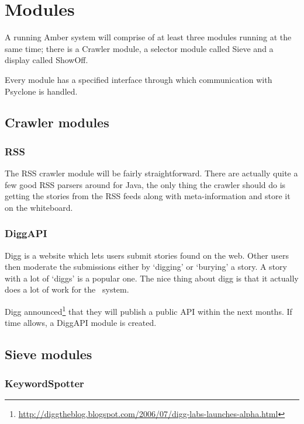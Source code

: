 \section{\label{sct:modules}Modules}

A running Amber system will comprise of at least three modules running at the
same time; there is a Crawler module, a selector module called Sieve and a
display called ShowOff.

Every module has a specified interface through which communication with
Psyclone is handled.

\subsection{Crawler modules}

\subsubsection{RSS}

The RSS crawler module will be fairly straightforward. There are actually quite
a few good RSS parsers around for Java, the only thing the crawler should do is
getting the stories from the RSS feeds along with meta-information and store it
on the whiteboard.

\subsubsection{DiggAPI}

Digg is a website which lets users submit stories found on the web. Other users
then moderate the submissions either by `digging' or `burying' a story. A story
with a lot of `diggs' is a popular one. The nice thing about digg is that it
actually does a lot of work for the \Amber\ system.

Digg
announced\footnote{\url{http://diggtheblog.blogspot.com/2006/07/digg-labs-launches-alpha.html}}
that they will publish a public API within the next months. If time allows, a
DiggAPI module is created.

\subsection{Sieve modules}

\subsubsection{KeywordSpotter}

